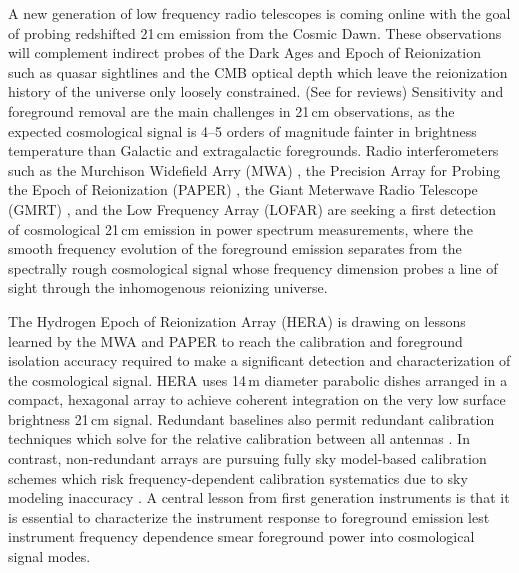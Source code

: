 \documentclass{emulateapj}
\begin{document}
A new generation of low frequency radio telescopes is coming online with the goal of
 probing redshifted 21\,cm emission from the Cosmic Dawn. These observations will 
 complement indirect probes of the Dark Ages and Epoch of Reionization such as quasar 
 sightlines and the CMB optical depth which leave the reionization 
 history of the universe only loosely constrained. (See \citet{FurlanettoReview, miguelreview, PritchardLoebReview, aviBook, zaroubi} for reviews) Sensitivity and foreground removal are 
 the main challenges in 21\,cm observations, as the expected cosmological signal is 4--5 
 orders of magnitude fainter in brightness temperature than Galactic and extragalactic foregrounds. Radio 
 interferometers such as the Murchison Widefield Arry (MWA) \citep{tingay13,mwascience}, the Precision Array for Probing the Epoch of Reionization (PAPER) \citep{ali2015}, the Giant Meterwave Radio Telescope (GMRT) 
 \citep{Paciga2011}, and the Low Frequency Array (LOFAR) \citep{lofar} are seeking a first detection of 
 cosmological 21\,cm emission in power spectrum measurements, where the smooth 
 frequency evolution of the foreground emission separates from the spectrally 
 rough cosmological signal whose frequency dimension probes a line of sight through the 
 inhomogenous reionizing universe.


The Hydrogen Epoch of Reionization Array (HERA) \citep[][deBoer et al. (in prep)]{PoberNextGen} is drawing on lessons learned by the MWA and PAPER to reach the calibration and foreground isolation accuracy required to make a significant detection and characterization of the cosmological signal. HERA uses 14\,m diameter parabolic dishes arranged in a compact, hexagonal array to achieve coherent integration on the very low surface brightness 21\,cm signal. Redundant baselines also permit redundant calibration techniques which solve for the relative calibration between all antennas \citep{liu2010,zheng14}. In contrast, non-redundant arrays are pursuing fully sky model-based calibration schemes which risk frequency-dependent calibration systematics due to sky modeling inaccuracy \citep{braun2013}. A central lesson from first generation instruments is that it is essential to characterize the instrument response to foreground emission lest instrument frequency dependence smear foreground power into cosmological signal modes. 

\end{document}
